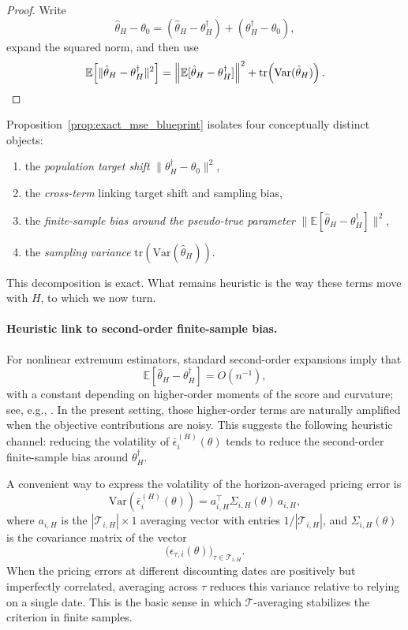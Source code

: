 \begin{proof}
	Write
	\[
	\hat{\theta}_H - \theta_0
	=
	(\hat{\theta}_H - \theta_H^\dagger)
	+
	(\theta_H^\dagger - \theta_0),
	\]
	expand the squared norm, and then use
	\[
	\mathbb{E}\!\left[
	\|\hat{\theta}_H - \theta_H^\dagger\|^2
	\right]
	=
	\left\|
	\mathbb{E}[\hat{\theta}_H - \theta_H^\dagger]
	\right\|^2
	+
	\mathrm{tr}\!\left(
	\mathrm{Var}(\hat{\theta}_H)
	\right).
	\qedhere
	\]
\end{proof}

Proposition~\ref{prop:exact_mse_blueprint} isolates four conceptually distinct objects:
\begin{enumerate}
	\item the \emph{population target shift} $\|\theta_H^\dagger - \theta_0\|^2$,
	\item the \emph{cross-term} linking target shift and sampling bias,
	\item the \emph{finite-sample bias around the pseudo-true parameter}
	$\|\mathbb{E}[\hat{\theta}_H - \theta_H^\dagger]\|^2$,
	\item the \emph{sampling variance} $\mathrm{tr}(\mathrm{Var}(\hat{\theta}_H))$.
\end{enumerate}

This decomposition is exact.
What remains heuristic is the way these terms move with $H$, to which we now turn.

\paragraph{Heuristic link to second-order finite-sample bias.}
For nonlinear extremum estimators, standard second-order expansions imply that
\[
\mathbb{E}[\hat{\theta}_H - \theta_H^\dagger] = O(n^{-1}),
\]
with a constant depending on higher-order moments of the score and curvature; see, e.g., \citet{nagar1959bias, rilstone1996second, newey2004higher, bao2007finite}.
In the present setting, those higher-order terms are naturally amplified when the objective contributions are noisy.
This suggests the following heuristic channel:
reducing the volatility of $\bar{\epsilon}_i^{(H)}(\theta)$ tends to reduce the second-order finite-sample bias around $\theta_H^\dagger$.

A convenient way to express the volatility of the horizon-averaged pricing error is
\begin{equation}
	\label{eq:var_matrix_blueprint}
	\mathrm{Var}\!\left(
	\bar{\epsilon}_i^{(H)}(\theta)
	\right)
	=
	a_{i,H}^\top \Sigma_{i,H}(\theta)\, a_{i,H},
\end{equation}
where $a_{i,H}$ is the $|\mathcal{T}_{i,H}| \times 1$ averaging vector with entries $1/|\mathcal{T}_{i,H}|$, and $\Sigma_{i,H}(\theta)$ is the covariance matrix of the vector
\[
\bigl(
\epsilon_{\tau,i}(\theta)
\bigr)_{\tau \in \mathcal{T}_{i,H}}.
\]
When the pricing errors at different discounting dates are positively but imperfectly correlated, averaging across $\tau$ reduces this variance relative to relying on a single date.
This is the basic sense in which $\mathcal{T}$-averaging stabilizes the criterion in finite samples.

